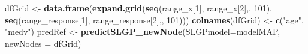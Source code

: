 \documentclass[
]{article}
\newenvironment{Shaded}{\begin{snugshade}}{\end{snugshade}}
\newcommand{\AttributeTok}[1]{\textcolor[rgb]{0.13,0.29,0.53}{#1}}
\newcommand{\DecValTok}[1]{\textcolor[rgb]{0.00,0.00,0.81}{#1}}
\newcommand{\FunctionTok}[1]{\textcolor[rgb]{0.13,0.29,0.53}{\textbf{#1}}}
\newcommand{\NormalTok}[1]{#1}
\newcommand{\OtherTok}[1]{\textcolor[rgb]{0.56,0.35,0.01}{#1}}
\newcommand{\StringTok}[1]{\textcolor[rgb]{0.31,0.60,0.02}{#1}}
\begin{document}
\begin{Shaded}
\begin{Highlighting}[]


\NormalTok{dfGrid }\OtherTok{\textless{}{-}} \FunctionTok{data.frame}\NormalTok{(}\FunctionTok{expand.grid}\NormalTok{(}\FunctionTok{seq}\NormalTok{(range\_x[}\DecValTok{1}\NormalTok{], range\_x[}\DecValTok{2}\NormalTok{],, }\DecValTok{101}\NormalTok{), }
                                 \FunctionTok{seq}\NormalTok{(range\_response[}\DecValTok{1}\NormalTok{], range\_response[}\DecValTok{2}\NormalTok{],, }\DecValTok{101}\NormalTok{)))}
\FunctionTok{colnames}\NormalTok{(dfGrid) }\OtherTok{\textless{}{-}} \FunctionTok{c}\NormalTok{(}\StringTok{"age"}\NormalTok{, }\StringTok{"medv"}\NormalTok{)}
\NormalTok{predRef }\OtherTok{\textless{}{-}} \FunctionTok{predictSLGP\_newNode}\NormalTok{(}\AttributeTok{SLGPmodel=}\NormalTok{modelMAP,}
                               \AttributeTok{newNodes =}\NormalTok{ dfGrid)}


\end{Highlighting}
\end{Shaded}
\end{document}
